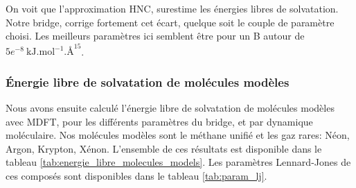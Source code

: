  On voit que l'approximation HNC, surestime les énergies libres de solvatation. Notre bridge, corrige fortement cet écart, quelque soit le couple de paramètre choisi. Les meilleurs paramètres ici semblent être pour un B autour de $5e^{-8}\  \mathrm{kJ.mol}^{-1}.\text{\AA}^{15}$. 

 



\subsubsection{\'Energie libre de solvatation de molécules modèles}
Nous avons ensuite calculé l'énergie libre de solvatation de molécules modèles avec MDFT, pour les différents paramètres du bridge, et par dynamique moléculaire. Nos molécules modèles sont le méthane unifié et les gaz rares: Néon, Argon, Krypton, Xénon. L'ensemble de ces résultats est disponible dans le tableau \ref{tab:energie_libre_molecules_models}. Les paramètres Lennard-Jones de ces composés sont disponibles dans le tableau \ref{tab:param_lj}.


